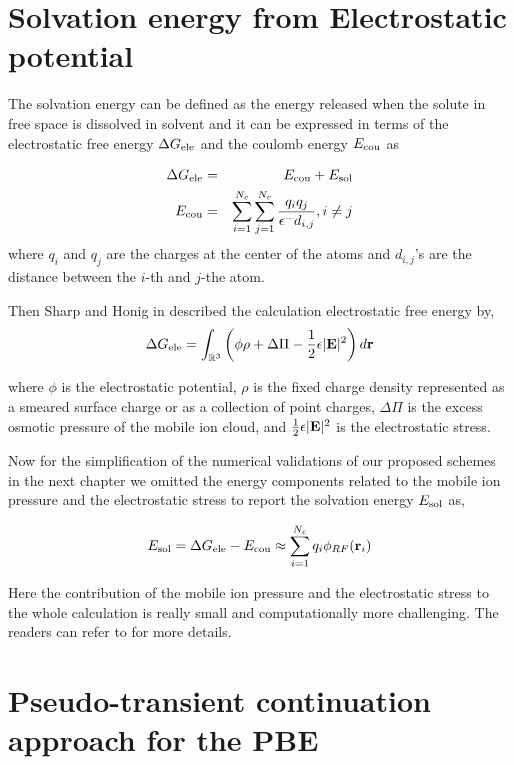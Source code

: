 \section{Solvation energy from Electrostatic potential}

The solvation energy can be defined as the energy released when the solute in free space is dissolved in solvent and it can be expressed in terms of the electrostatic free energy $\Delta G_{\rm ele}$ and the coulomb energy $E_{\rm cou}$ as 

\begin{eqnarray}
	\Delta G_{\rm ele}&=& E_{\rm cou}+ E_{\rm sol}\label{eq_Gele}\\
	E_{\rm cou} &=& \sum_{i=1}^{N_c}\sum_{j=1}^{N_c}\frac{q_iq_j}{\epsilon^-d_{i,j}}, i\neq j\label{eq_Ecou}
\end{eqnarray}
where $q_i$ and $q_j$ are the charges at the center of the atoms and $d_{i,j}$'s are the distance between the $i$-th and $j$-the atom. 
  
Then Sharp and Honig in \cite{Sharp_Honig}  described the calculation electrostatic free energy by, 
\begin{equation}
\Delta G_{\rm ele}=\int_{\mathbb{R}^3}\left(\phi\rho+\Delta\Pi-\frac{1}{2}\epsilon|{\bf E}|^2\right)d{\bf r}
\end{equation}

where $\phi$ is the electrostatic potential, $\rho$ is the fixed charge density represented as a smeared surface charge or as a collection of point charges, $\Delta\Pi$ is  the excess osmotic pressure of the mobile ion cloud, and $\frac{1}{2}\epsilon|{\bf E}|^2$ is the electrostatic stress.

Now for the simplification of the numerical validations of our proposed schemes in the next chapter we omitted the energy components related to the mobile ion pressure and the electrostatic stress to report the solvation energy $E_{\rm sol}$ as,  

\begin{eqnarray}
	E_{\rm sol}=\Delta G_{\rm ele}-E_{\rm cou}\approx\sum\limits_{i=1}^{N_c}q_i\phi_{RF} ({\bf r}_i)\label{eq_solvation}
\end{eqnarray}

Here the contribution of the mobile ion pressure and the electrostatic stress to the whole calculation is really small and computationally more challenging. The readers can refer to \cite{GENG_WEI2011,Gilson,Sharp_Honig} for more details.				


\section{Pseudo-transient continuation approach for the PBE}

